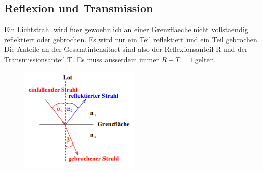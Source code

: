\subsection{Reflexion und Transmission}
Ein Lichtstrahl wird fuer gewoehnlich an einer Grenzflaeche nicht vollstaendig reflektiert oder gebrochen. Es wird nur ein Teil reflektiert und ein Teil gebrochen. Die Anteile an der Gesamtintensitaet sind also der Reflexionsanteil R und der Transmissionsanteil T. Es muss ausserdem immer $R+T=1$ gelten. 
\begin{figure}[H]
    \centering
    \captionsetup{justification=centering}
    \includegraphics[height=5cm]{"Transmission_Beugung.png"}
    \label{Fig:Transmission}
\end{figure}
